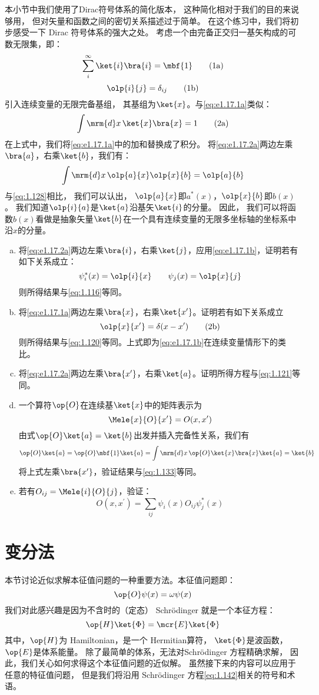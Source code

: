 { 本小节中我们使用了Dirac符号体系的简化版本，
 这种简化相对于我们的目的来说够用，
 但对矢量和函数之间的密切关系描述过于简单。
 在这个练习中，我们将初步感受一下 Dirac 符号体系的强大之处。
 考虑一个由完备正交归一基矢构成的可数无限集，即：
\[
     \sum_i^\infty \ket{i}\bra{i} = \mbf{1}
     \tag{1a}\label{eq:e1.17.1a}
\]
\[
     \olp{i}{j} = \delta_{ij}
     \tag{1b}\label{eq:e1.17.1b}
\]
引入连续变量的无限完备基组，
其基组为$\ket{x}$。与\autoref{eq:e1.17.1a}类似：
\[
\int\mrm{d}x\,\ket{x}\bra{x} = 1
\tag{2a}\label{eq:e1.17.2a}
\]
在上式中，我们将\autoref{eq:e1.17.1a}中的加和替换成了积分。
将\autoref{eq:e1.17.2a}两边左乘$\bra{a}$，右乘$\ket{b}$，我们有：
\[
\int\mrm{d}x\, \olp{a}{x}\olp{x}{b} = \olp{a}{b}
\]
与\autoref{eq:1.128}相比，
我们可以认出，
$\olp{a}{x}$即$a^\ast(x)$，$\olp{x}{b}$即$b(x)$。
我们知道$\olp{i}{a}$是$\ket{a}$沿基矢$\ket{i}$的分量。
因此，
我们可以将函数$b(x)$看做是抽象矢量$\ket{b}$在一个具有连续变量的无限多坐标轴的坐标系中沿$x$的分量。
\begin{enumerate}[a.]
 \item 将\autoref{eq:e1.17.2a}两边左乘$\bra{i}$，右乘$\ket{j}$，应用\autoref{eq:e1.17.1b}，证明若有如下关系成立：
 \[
 \psi^\ast_i(x) = \olp{i}{x} \qquad \psi_j(x) = \olp{x}{j}
 \]
 则所得结果与\autoref{eq:1.116}等同。
 \item 将\autoref{eq:e1.17.1a}两边左乘$\bra{x}$，右乘$\ket{x^\prime}$。证明若有如下关系成立
 \[
 \olp{x}{x^\prime} = \delta(x - x^\prime)
 \tag{2b} \label{eq:e1.17.2b}
 \]
 则所得结果与\autoref{eq:1.120}等同。上式即为\autoref{eq:e1.17.1b}在连续变量情形下的类比。
 \item 将\autoref{eq:e1.17.2a}两边左乘$\bra{x^\prime}$，右乘$\ket{a}$。证明所得方程与\autoref{eq:1.121}等同。
 \item 一个算符$\op{O}$在连续基$\ket{x}$中的矩阵表示为
 \[\Mele{x}{O}{x^\prime} = O(x, x^\prime)\]
 由式$\op{O}\ket{a} = \ket{b}$出发并插入完备性关系，我们有
 \[\op{O}\ket{a} = \op{O}\mbf{1}\ket{a} = \int\mrm{d}x\,\op{O}\ket{x}\bra{x}\ket{a} = \ket{b}\]
 将上式左乘$\bra{x^\prime}$，验证结果与\autoref{eq:1.133}等同。
 \item 若有$O_{ij} = \Mele{i}{O}{j}$，验证：
 \[O(x,x^\prime) = \sum_{ij}\psi_i(x)O_{ij}\psi_j^\ast(x)\]
\end{enumerate}
}


\section{变分法}
\label{sec:1.3}
本节讨论近似求解本征值问题的一种重要方法。本征值问题即：
\begin{equation}
 \op{O}\psi(x) =\omega\psi(x)
 \label{eq:1.141}
\end{equation}
我们对此感兴趣是因为不含时的（定态） Schr\"{o}dinger 就是一个本征方程：
\begin{equation}
 \op{H} \ket{\Phi} = \mcr{E} \ket{\Phi}
 \label{eq:1.142}
\end{equation}
其中，$\op{H}$为 Hamiltonian，是一个 Hermitian算符，
$\ket{\Phi}$是波函数，$\op{E}$是体系能量。
除了最简单的体系，无法对Schr\"odinger 方程精确求解，
因此，我们关心如何求得这个本征值问题的近似解。
虽然接下来的内容可以应用于任意的特征值问题，
但是我们将沿用 Schr\"odinger 方程\autoref{eq:1.142}相关的符号和术语。

